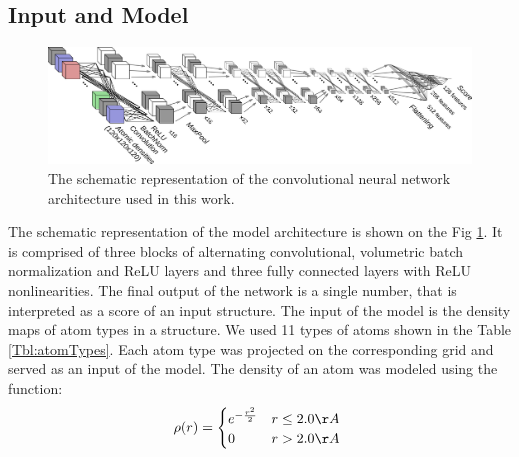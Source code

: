 \documentclass[a4paper,10pt]{article}
\begin{document}
\subsection{Input and Model}
\begin{figure}[H]
    \centering
    \includegraphics[width=\linewidth]{Fig/ConvnetDiagramV1.png}
    \caption{The schematic representation of the convolutional neural network architecture used in this work.}
    \label{Fig:CNNModel}
\end{figure}
The schematic representation of the model architecture is shown on the Fig \ref{Fig:CNNModel}. 
It is comprised of three blocks of alternating convolutional, 
volumetric batch normalization and ReLU layers and three 
fully connected layers with ReLU nonlinearities. The final output of the network is a single number, 
that is interpreted as a score of an input structure.
The input of the model is the density maps of atom types in a structure. We used 11 types of atoms shown in the Table \ref{Tbl:atomTypes}. 
Each atom type was projected on the corresponding grid and served as an input of the model. 
The density of an atom was modeled using the function: 
$$
\rho(r) =  \begin{cases}
               e^{-\frac{r^2}{2}}&r\leq 2.0\AA~\\
               0                 &r>2.0\AA~\\
            \end{cases}
$$
\end{document}
